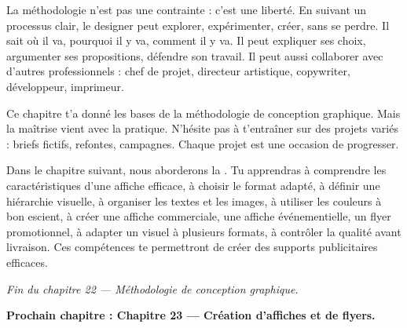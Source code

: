 La méthodologie n'est pas une contrainte : c'est une liberté. En suivant un processus clair, le designer peut explorer, expérimenter, créer, sans se perdre. Il sait où il va, pourquoi il y va, comment il y va. Il peut expliquer ses choix, argumenter ses propositions, défendre son travail. Il peut aussi collaborer avec d'autres professionnels : chef de projet, directeur artistique, copywriter, développeur, imprimeur.

Ce chapitre t'a donné les bases de la méthodologie de conception graphique. Mais la maîtrise vient avec la pratique. N'hésite pas à t'entraîner sur des projets variés : briefs fictifs, refontes, campagnes. Chaque projet est une occasion de progresser.

Dans le chapitre suivant, nous aborderons la . Tu apprendras à comprendre les caractéristiques d'une affiche efficace, à choisir le format adapté, à définir une hiérarchie visuelle, à organiser les textes et les images, à utiliser les couleurs à bon escient, à créer une affiche commerciale, une affiche événementielle, un flyer promotionnel, à adapter un visuel à plusieurs formats, à contrôler la qualité avant livraison. Ces compétences te permettront de créer des supports publicitaires efficaces.

\vspace{2em}

\begin{center}
\textit{Fin du chapitre 22 --- Méthodologie de conception graphique.}

\vspace{1em}

\textbf{Prochain chapitre : Chapitre 23 --- Création d'affiches et de flyers.}
\end{center}